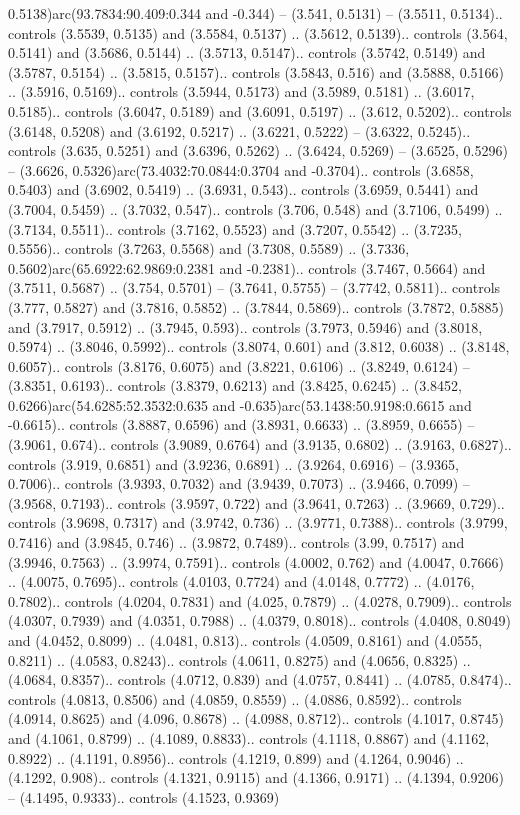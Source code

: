 0.5138)arc(93.7834:90.409:0.344 and -0.344) -- (3.541, 0.5131) -- (3.5511, 0.5134).. controls (3.5539, 0.5135) and (3.5584, 0.5137) .. (3.5612, 0.5139).. controls (3.564, 0.5141) and (3.5686, 0.5144) .. (3.5713, 0.5147).. controls (3.5742, 0.5149) and (3.5787, 0.5154) .. (3.5815, 0.5157).. controls (3.5843, 0.516) and (3.5888, 0.5166) .. (3.5916, 0.5169).. controls (3.5944, 0.5173) and (3.5989, 0.5181) .. (3.6017, 0.5185).. controls (3.6047, 0.5189) and (3.6091, 0.5197) .. (3.612, 0.5202).. controls (3.6148, 0.5208) and (3.6192, 0.5217) .. (3.6221, 0.5222) -- (3.6322, 0.5245).. controls (3.635, 0.5251) and (3.6396, 0.5262) .. (3.6424, 0.5269) -- (3.6525, 0.5296) -- (3.6626, 0.5326)arc(73.4032:70.0844:0.3704 and -0.3704).. controls (3.6858, 0.5403) and (3.6902, 0.5419) .. (3.6931, 0.543).. controls (3.6959, 0.5441) and (3.7004, 0.5459) .. (3.7032, 0.547).. controls (3.706, 0.548) and (3.7106, 0.5499) .. (3.7134, 0.5511).. controls (3.7162, 0.5523) and (3.7207, 0.5542) .. (3.7235, 0.5556).. controls (3.7263, 0.5568) and (3.7308, 0.5589) .. (3.7336, 0.5602)arc(65.6922:62.9869:0.2381 and -0.2381).. controls (3.7467, 0.5664) and (3.7511, 0.5687) .. (3.754, 0.5701) -- (3.7641, 0.5755) -- (3.7742, 0.5811).. controls (3.777, 0.5827) and (3.7816, 0.5852) .. (3.7844, 0.5869).. controls (3.7872, 0.5885) and (3.7917, 0.5912) .. (3.7945, 0.593).. controls (3.7973, 0.5946) and (3.8018, 0.5974) .. (3.8046, 0.5992).. controls (3.8074, 0.601) and (3.812, 0.6038) .. (3.8148, 0.6057).. controls (3.8176, 0.6075) and (3.8221, 0.6106) .. (3.8249, 0.6124) -- (3.8351, 0.6193).. controls (3.8379, 0.6213) and (3.8425, 0.6245) .. (3.8452, 0.6266)arc(54.6285:52.3532:0.635 and -0.635)arc(53.1438:50.9198:0.6615 and -0.6615).. controls (3.8887, 0.6596) and (3.8931, 0.6633) .. (3.8959, 0.6655) -- (3.9061, 0.674).. controls (3.9089, 0.6764) and (3.9135, 0.6802) .. (3.9163, 0.6827).. controls (3.919, 0.6851) and (3.9236, 0.6891) .. (3.9264, 0.6916) -- (3.9365, 0.7006).. controls (3.9393, 0.7032) and (3.9439, 0.7073) .. (3.9466, 0.7099) -- (3.9568, 0.7193).. controls (3.9597, 0.722) and (3.9641, 0.7263) .. (3.9669, 0.729).. controls (3.9698, 0.7317) and (3.9742, 0.736) .. (3.9771, 0.7388).. controls (3.9799, 0.7416) and (3.9845, 0.746) .. (3.9872, 0.7489).. controls (3.99, 0.7517) and (3.9946, 0.7563) .. (3.9974, 0.7591).. controls (4.0002, 0.762) and (4.0047, 0.7666) .. (4.0075, 0.7695).. controls (4.0103, 0.7724) and (4.0148, 0.7772) .. (4.0176, 0.7802).. controls (4.0204, 0.7831) and (4.025, 0.7879) .. (4.0278, 0.7909).. controls (4.0307, 0.7939) and (4.0351, 0.7988) .. (4.0379, 0.8018).. controls (4.0408, 0.8049) and (4.0452, 0.8099) .. (4.0481, 0.813).. controls (4.0509, 0.8161) and (4.0555, 0.8211) .. (4.0583, 0.8243).. controls (4.0611, 0.8275) and (4.0656, 0.8325) .. (4.0684, 0.8357).. controls (4.0712, 0.839) and (4.0757, 0.8441) .. (4.0785, 0.8474).. controls (4.0813, 0.8506) and (4.0859, 0.8559) .. (4.0886, 0.8592).. controls (4.0914, 0.8625) and (4.096, 0.8678) .. (4.0988, 0.8712).. controls (4.1017, 0.8745) and (4.1061, 0.8799) .. (4.1089, 0.8833).. controls (4.1118, 0.8867) and (4.1162, 0.8922) .. (4.1191, 0.8956).. controls (4.1219, 0.899) and (4.1264, 0.9046) .. (4.1292, 0.908).. controls (4.1321, 0.9115) and (4.1366, 0.9171) .. (4.1394, 0.9206) -- (4.1495, 0.9333).. controls (4.1523, 0.9369) 